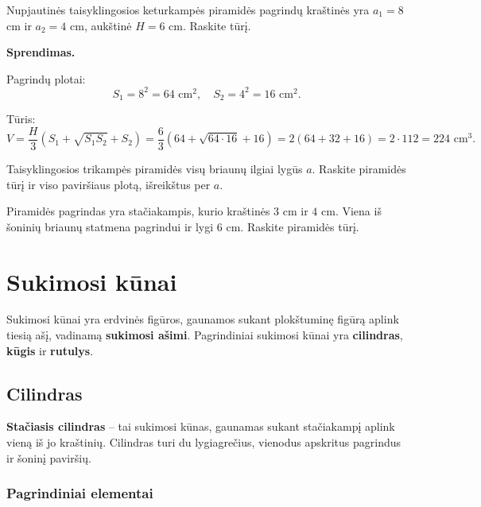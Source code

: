 \begin{example}
Nupjautinės taisyklingosios keturkampės piramidės pagrindų kraštinės yra $a_1 = 8$ cm ir $a_2 = 4$ cm, aukštinė $H = 6$ cm. Raskite tūrį.

\textbf{Sprendimas.}

Pagrindų plotai:
\[
    S_1 = 8^2 = 64 \text{ cm}^2, \quad S_2 = 4^2 = 16 \text{ cm}^2.
\]

Tūris:
\[
    V = \frac{H}{3}(S_1 + \sqrt{S_1 S_2} + S_2) = \frac{6}{3}(64 + \sqrt{64 \cdot 16} + 16) = 2(64 + 32 + 16) = 2 \cdot 112 = 224 \text{ cm}^3.
\]
\end{example}

\begin{exercise}
Taisyklingosios trikampės piramidės visų briaunų ilgiai lygūs $a$. Raskite piramidės tūrį ir viso paviršiaus plotą, išreikštus per $a$.
\end{exercise}

\begin{exercise}
Piramidės pagrindas yra stačiakampis, kurio kraštinės $3$ cm ir $4$ cm. Viena iš šoninių briaunų statmena pagrindui ir lygi $6$ cm. Raskite piramidės tūrį.
\end{exercise}


\section{Sukimosi kūnai}

Sukimosi kūnai yra erdvinės figūros, gaunamos sukant plokštuminę figūrą aplink tiesią ašį, vadinamą \textbf{sukimosi ašimi}. Pagrindiniai sukimosi kūnai yra \textbf{cilindras}, \textbf{kūgis} ir \textbf{rutulys}.

\subsection{Cilindras}

\begin{definition}
\textbf{Stačiasis cilindras} – tai sukimosi kūnas, gaunamas sukant stačiakampį aplink vieną iš jo kraštinių. Cilindras turi du lygiagrečius, vienodus apskritus pagrindus ir šoninį paviršių.
\end{definition}

\subsubsection*{Pagrindiniai elementai}

